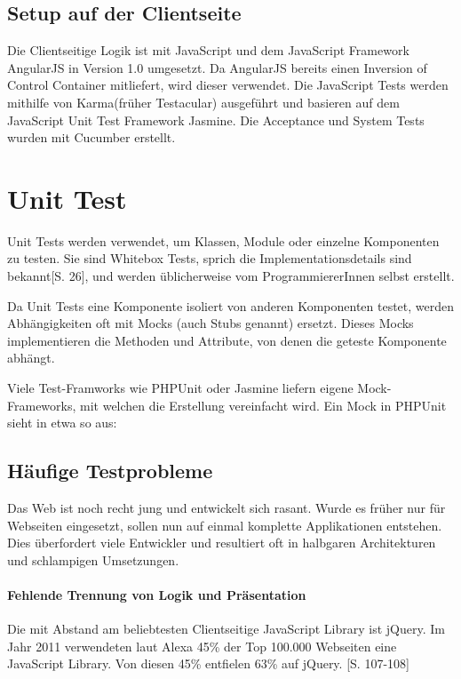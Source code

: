 \documentclass[a4paper,bibtotoc,oneside]{scrbook}
\begin{document}
\section{Setup auf der Clientseite}
Die Clientseitige Logik ist mit JavaScript und dem JavaScript Framework AngularJS\cite{angular} in Version 1.0 umgesetzt. Da AngularJS bereits einen Inversion of Control Container mitliefert, wird dieser verwendet. Die JavaScript Tests werden mithilfe von Karma\cite{karma}(früher Testacular) ausgeführt und basieren auf dem JavaScript Unit Test Framework Jasmine\cite{jasmine}. 
Die Acceptance und System Tests wurden mit Cucumber\cite{cucumber} erstellt.


\chapter{Unit Test}
Unit Tests werden verwendet, um Klassen, Module oder einzelne Komponenten zu testen. Sie sind Whitebox Tests, sprich die Implementationsdetails sind bekannt\cite{betrieb}[S. 26], und werden üblicherweise vom ProgrammiererInnen selbst erstellt. 

Da Unit Tests eine Komponente isoliert von anderen Komponenten testet, werden Abhängigkeiten oft mit Mocks (auch Stubs genannt) ersetzt. Dieses Mocks implementieren die Methoden und Attribute, von denen die geteste Komponente abhängt. 

Viele Test-Framworks wie PHPUnit oder Jasmine liefern eigene Mock-Frameworks, mit welchen die Erstellung vereinfacht wird. Ein Mock in PHPUnit sieht in etwa so aus:



\section{Häufige Testprobleme}
Das Web ist noch recht jung und entwickelt sich rasant. Wurde es früher nur für Webseiten eingesetzt, sollen nun auf einmal komplette Applikationen entstehen. Dies überfordert viele Entwickler und resultiert oft in halbgaren Architekturen und schlampigen Umsetzungen. 


\subsubsection{Fehlende Trennung von Logik und Präsentation}
Die mit Abstand am beliebtesten Clientseitige JavaScript Library ist jQuery. Im Jahr 2011 verwendeten laut Alexa 45\% der Top 100.000 Webseiten eine JavaScript Library. Von diesen 45\% entfielen 63\% auf jQuery. \cite{jquery}[S. 107-108]
\end{document}
